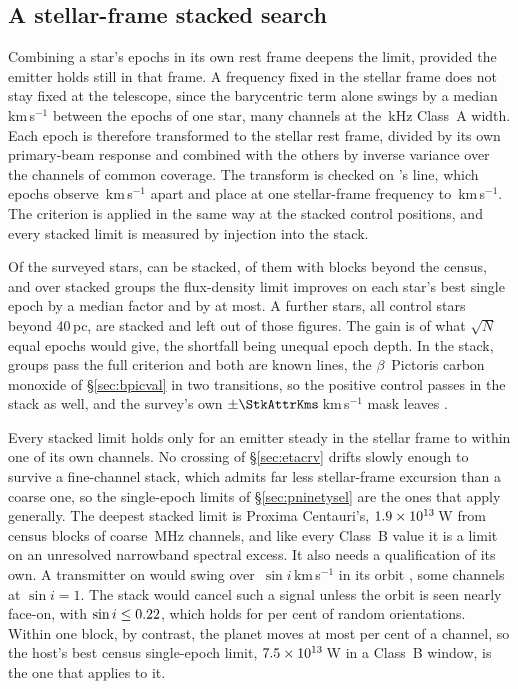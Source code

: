 \subsection{A stellar-frame stacked search}
\label{sec:stack}

Combining a star's epochs in its own rest frame deepens the limit, provided
the emitter holds still in that frame. A frequency fixed in the stellar
frame does not stay fixed at the telescope, since the barycentric term
alone swings by a median \StkVcorrSwingMed\,km\,s$^{-1}$ between the epochs
of one star, many channels at the \StkRefChanKHz\,kHz Class~A width. Each
epoch is therefore
transformed to the stellar rest frame, divided by its own primary-beam
response and combined with the others by inverse variance over the channels
of common coverage. The transform is checked on \StkPersistLineStar's line,
which \StkRegNEpoch{} epochs observe \StkRegTopoKms\,km\,s$^{-1}$ apart and
place at one stellar-frame frequency to \FrEpochStelKms\,km\,s$^{-1}$. The
criterion is applied in the same way at the stacked control positions, and
every stacked limit is measured by injection into the stack.

Of the surveyed stars, \SxStkStarCensus{} can be stacked, \SttNStkOneEb{} of
them with blocks beyond the census, and over \SyStkNGroup{} stacked groups
the flux-density limit improves on each star's best single epoch by a median
factor \SyStkGainMed{} and by \SyStkGainMax{} at most. A further
\SxStkStarOutside{} stars, all control stars beyond 40\,pc, are stacked and left
out of those figures. The gain is \StkGainVsN{} of what $\sqrt{N}$ equal
epochs would give, the shortfall being unequal epoch depth.
In the stack, \StkNSurvive{} groups pass the full criterion and both are
known lines, the $\beta$~Pictoris carbon monoxide of \S\ref{sec:bpicval} in two
transitions, so the positive control passes in the stack as well, and the
survey's own $\pm\StkAttrKms$\,km\,s$^{-1}$ mask leaves \StkUnattrClause.

Every stacked limit holds only for an emitter steady in the stellar frame to
within one of its own channels. No crossing of \S\ref{sec:etacrv} drifts
slowly enough to survive a fine-channel stack, which admits far less
stellar-frame excursion than a coarse one, so the single-epoch limits of
\S\ref{sec:pninetysel} are the ones that apply generally. The deepest
stacked limit is Proxima Centauri's, $1.9\times10^{13}$\,W from
\SxProxEbCensus{} census blocks of coarse \ChanBModeMHz\,MHz channels, and
like every Class~B value it is a limit on an unresolved narrowband spectral
excess. It also needs a qualification of its own. A transmitter on
\PxPlanet{} would swing over \PxPPKms\,$\sin i$\,km\,s$^{-1}$ in its orbit
\citep{AngladaEscude2016,Kervella2017,NEA2013}, some \PxNChanWalk{} channels
at $\sin i=1$. The stack would cancel such a signal unless the orbit is seen
nearly face-on, with $\sin i\le0.22$, which holds for \PxIsoPct{} per
cent of random orientations. Within one block, by contrast, the planet moves at most
\PxBlockPct{} per cent of a channel, so the host's best census single-epoch
limit, $7.5\times10^{13}$\,W in a Class~B window, is the one that applies to it.
